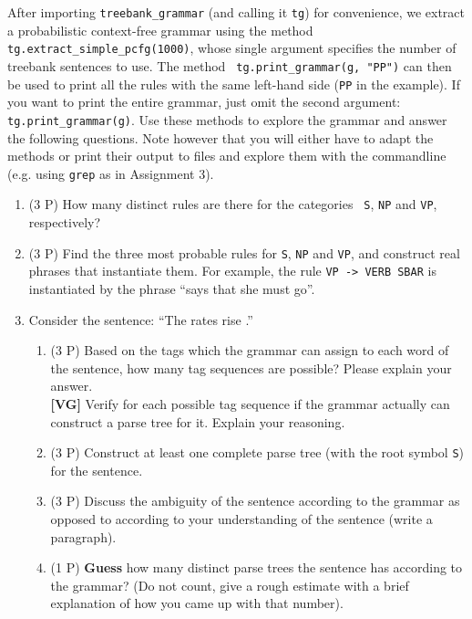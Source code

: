 \documentclass[10.9pt]{article}
\begin{document}
\begin{center}
\fbox{

}
\end{center}
After importing {\tt treebank\_grammar} (and calling it {\tt tg}) for
convenience, we extract a probabilistic context-free grammar using the
method {\tt tg.extract\_simple\_pcfg(1000)}, whose single argument
specifies the number of treebank sentences to use. The method {\tt
  tg.print\_grammar(g, "PP")} can then be used to print all the rules
with the same left-hand side ({\tt PP} in the example). If you want to
print the entire grammar, just omit the second argument: {\tt
  tg.print\_grammar(g)}. Use these methods to explore the grammar and
answer the following questions. Note however that you will either have
to adapt the methods or print their output to files and explore them
with the commandline (e.g. using {\tt grep} as in Assignment 3).
\begin{enumerate}[topsep=0.2cm,itemsep=0cm]
\item (3 P) How many distinct rules are there for the categories {\tt
    S}, {\tt NP} and {\tt VP}, respectively?
\item (3 P) Find the three most probable rules for {\tt S}, {\tt NP}
  and {\tt VP}, and construct real phrases that instantiate them.  For
  example, the rule {\tt VP -> VERB SBAR} is instantiated by the
  phrase ``says that she must go''.
\item Consider the sentence: ``The rates rise .''
  \begin{enumerate}[noitemsep,topsep=0cm]
  \item (3 P) Based on the tags which the grammar can assign to each
    word of the sentence, how many tag sequences are possible? Please
    explain your answer.\\
    \textbf{[VG]} Verify for each possible tag sequence if the grammar
    actually can construct a parse tree for it. Explain your reasoning.
\item (3 P) Construct at least one complete parse tree (with the root
  symbol {\tt S}) for the sentence.
\item (3 P) Discuss the ambiguity of the sentence according to the 
    grammar as opposed to according to your understanding of the
    sentence (write a paragraph).
\item (1 P) \textbf{Guess} how many distinct parse trees the sentence
  has according to the grammar? (Do not count, give a rough estimate
  with a brief explanation of how you came up with that number).
\end{enumerate}
\end{enumerate}
\end{document}
